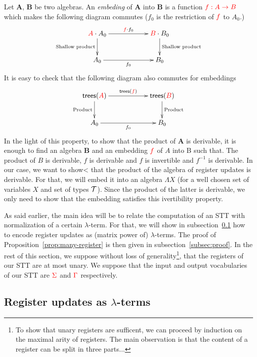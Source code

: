 Let $\mathbf{A}$, $\mathbf{B}$ be two algebras. An \emph{embeding} of $\mathbf{A}$ into $\mathbf{B}$ is a function ${\color{red}{f: {\color{red}{A}}\to {\color{red}{B}}}}$ which makes the following diagram commutes ($f_0$ is the restriction of ${\color{red}{f}}$ to $A_0$.)
      \begin{align*}
    \xymatrix@C=2cm{
        \ranked{A} \cdot A_0 \ar[r]^{\ranked{f}\cdot f_0} \ar[d]_{\text{Shallow product}} & \ranked{B}\cdot B_0 \ar[d]^{\text{Shallow product}}\\
A_0 \ar[r]_{f_0} & B_0       
       }
    \end{align*} 
It is easy to check that the following diagram also commutes for embeddings    
        \begin{align*}
    \xymatrix@C=2cm{
        \trees(\ranked{A}) \ar[r]^{\trees(\ranked{f})} \ar[d]_{\text{Product}} & \trees(\ranked{B}) \ar[d]^{\text{Product}}\\
A_0 \ar[r]_{f_0} & B_0       
       }
    \end{align*}  
 In the light of this property, to show that the product of $\mathbf{A}$ is derivable, it is enough to find an algebra $\mathbf{B}$ and an embedding ${\color{red}{f}}$ of $A$ into B such that. 
The product of $B$ is derivable, $f$ is derivable and $f$ is invertible and $f^{-1}$ is derivable.  
In our case, we want to show< that the product of the algebra of register updates is derivable. For that, we will embed it into an algebra $\Lambda X$ (for a well chosen set of variables $X$ and set of types ${\mathcal T}$). Since the product of the latter is derivable, we only need to show that the embedding satisfies this ivertibility property.



\newpage
As said earlier, the main idea will be to relate the computation of an STT with normalization of a certain $\lambda$-term. For that, we will show in subsection~\ref{subsec:ru-as-lambda} how to encode register updates as (matrix power of) $\lambda$-terms. The proof of Proposition~\ref{prop:many-register} is then given in subsection~\ref{subsec:proof}. In the rest of this section, we suppose without loss of generality\footnote{To show that unary registers are sufficent, we can proceed by induction on the maximal arity of registers. The main observation is  that the content of a register can be split in three parts...}, that the registers of our STT are at most unary. We suppose that the input and output vocabularies of our STT are ${\color{red}{\Sigma}}$ and ${\color{red}{\Gamma}}$ respectively. 

\subsection{Register updates as $\lambda$-terms}\label{subsec:ru-as-lambda}
